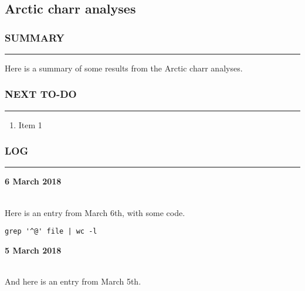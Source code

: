 \clearpage
\chapter{}
\section{Arctic charr analyses}
\subsection*{SUMMARY}
\hrule
Here is a summary of some results from the Arctic charr analyses.

\subsection*{NEXT TO-DO}
\hrule

\begin{enumerate}
\item Item 1
\end{enumerate}
\subsection*{LOG}
\hrule
\hrulefill
\begin{large}\textbf{6 March 2018}\end{large} \\
Here is an entry from March 6th, with some code.
\begin{verbatim} 
grep '^@' file | wc -l 
\end{verbatim}

\hrulefill
\begin{large}\textbf{5 March 2018}\end{large} \\
And here is an entry from March 5th.
